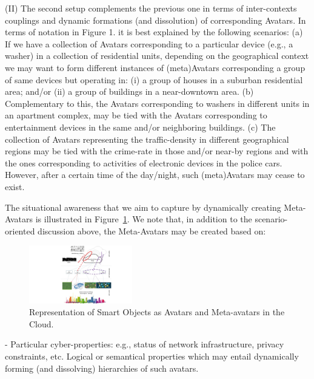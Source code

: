 (II) The second setup complements the previous one in terms of inter-contexts couplings and dynamic formations (and dissolution) of corresponding Avatars. In terms of notation in Figure 1. it is best explained by the following scenarios:
(a) If we have a collection of Avatars corresponding to a particular device (e.g., a washer) in a collection of residential units, depending on the geographical context we may want to form different instances of (meta)Avatars corresponding a group of same devices but operating in: (i) a group of houses in a suburban residential area; and/or (ii) a group of buildings in a near-downtown area.
(b) Complementary to this, the Avatars corresponding to washers in different units in an apartment complex, may be tied with the Avatars corresponding to entertainment devices in the same and/or neighboring buildings.
(c) The collection of Avatars representing the traffic-density in different geographical regions may be tied with the crime-rate in those and/or near-by regions and with the ones corresponding to activities of electronic devices in the police cars. However, after a certain time of the day/night, such (meta)Avatars may cease to exist. 

The situational awareness that we aim to capture by dynamically creating Meta-Avatars is illustrated in Figure~\ref{fig2}. We note that, in addition to the scenario-oriented discussion above, the Meta-Avatars may be created based on:\\

\begin{figure} \vspace{-3mm}
	\centerline{\includegraphics[width=0.40\textwidth]{./fig2.jpg}}
	\vspace{-3mm} \caption{\small Representation of Smart Objects as Avatars and Meta-avatars in the Cloud.}
	\label{fig2}
	\vspace{-3mm}
\end{figure}

-	Particular cyber-properties: e.g., status of network infrastructure, privacy constraints, etc.
Logical or semantical properties which may entail dynamically forming (and dissolving) hierarchies of such avatars.\\

